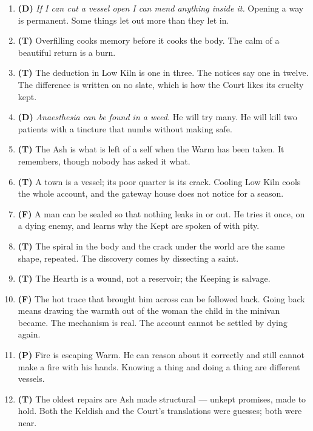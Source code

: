 \documentclass{design/chronicle}
\begin{document}
\begin{enumerate}[leftmargin=1.4em,itemsep=1pt,topsep=3pt,parsep=0pt]
\item \textbf{(D)} \emph{If I can cut a vessel open I can mend anything inside it.} Opening a way is permanent. Some things let out more than they let in.

\item \textbf{(T)} Overfilling cooks memory before it cooks the body. The calm of a beautiful return is a burn.

\item \textbf{(T)} The deduction in Low Kiln is one in three. The notices say one in twelve. The difference is written on no slate, which is how the Court likes its cruelty kept.

\item \textbf{(D)} \emph{Anaesthesia can be found in a weed.} He will try many. He will kill two patients with a tincture that numbs without making safe.

\item \textbf{(T)} The Ash is what is left of a self when the Warm has been taken. It remembers, though nobody has asked it what.

\item \textbf{(T)} A town is a vessel; its poor quarter is its crack. Cooling Low Kiln cools the whole account, and the gateway house does not notice for a season.

\item \textbf{(F)} A man can be sealed so that nothing leaks in or out. He tries it once, on a dying enemy, and learns why the Kept are spoken of with pity.

\item \textbf{(T)} The spiral in the body and the crack under the world are the same shape, repeated. The discovery comes by dissecting a saint.

\item \textbf{(T)} The Hearth is a wound, not a reservoir; the Keeping is salvage.

\item \textbf{(F)} The hot trace that brought him across can be followed back. Going back means drawing the warmth out of the woman the child in the minivan became. The mechanism is real. The account cannot be settled by dying again.

\item \textbf{(P)} Fire is escaping Warm. He can reason about it correctly and still cannot make a fire with his hands. Knowing a thing and doing a thing are different vessels.

\item \textbf{(T)} The oldest repairs are Ash made structural — unkept promises, made to hold. Both the Keldish and the Court’s translations were guesses; both were near.


\end{enumerate}
\end{document}
